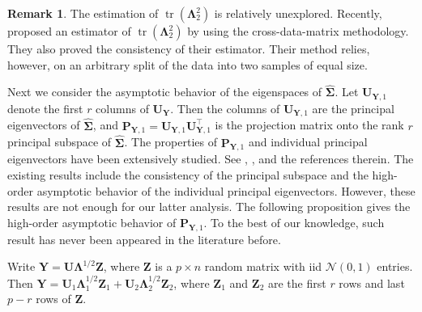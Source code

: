 \documentclass[12pt]{article} %
\DeclareMathOperator{\mytr}{tr}
\newcommand{\bZ}{\mathbf{Z}}
\newcommand{\bP}{\mathbf{P}}
\newcommand{\bY}{\mathbf{Y}}
\newcommand{\bU}{\mathbf{U}}
\newcommand{\bfsym}[1]{\ensuremath{\boldsymbol{#1}}}
\def\bLambda {\bfsym {\Lambda}}
\def\bSigma {\bfsym {\Sigma}}
\theoremstyle{definition}
\newtheorem{remark}{Remark}
\begin{document}
\begin{remark}
    The estimation of $\mytr(\bLambda_2^2)$ is relatively unexplored.
    Recently, \cite{Aoshima2018} proposed an estimator of $\mytr(\bLambda_2^2)$ by using the cross-data-matrix methodology.
    They also proved the consistency of their estimator.
    Their method relies, however,  on an arbitrary split of the data into two samples of equal size.
\end{remark}

Next we consider the asymptotic behavior of the eigenspaces of $\hat{\bSigma}$.
Let $\bU_{\bY,1}$ denote the first $r$ columns of $\bU_{\bY}$.
Then the columns of $\bU_{\bY,1}$ are the principal eigenvectors of $\hat{\bSigma}$, and $\bP_{\bY,1}=\bU_{\bY,1}\bU_{\bY,1}^\top$ is the projection matrix onto the rank $r$ principal subspace of $\hat{\bSigma}$.
The properties of $\bP_{\bY,1}$ and individual principal eigenvectors have been extensively studied.
See \cite{Cai2015Optimal}, \cite{Shen2016A}, \cite{wang2017As} and the references therein.
The existing results include the consistency of the principal subspace and the high-order asymptotic behavior of the individual principal eigenvectors.
However, these results are not enough for our latter analysis.
The following proposition gives the high-order asymptotic behavior of $\bP_{\bY,1}$.
To the best of our knowledge, such result has never been appeared in the literature before.



Write $\bY=\bU\bLambda^{1/2}\bZ$, where $\bZ$ is a $p\times n$ random matrix with iid $\mathcal{N}(0,1)$ entries.
    Then $\bY=\bU_1 \bLambda_1^{1/2} \bZ_1 +\bU_2 \bLambda_2^{1/2} \bZ_2$, where $\bZ_1$ and $\bZ_2$ are the first $r$ rows and last $p-r$ rows of $\bZ$.
\end{document}
